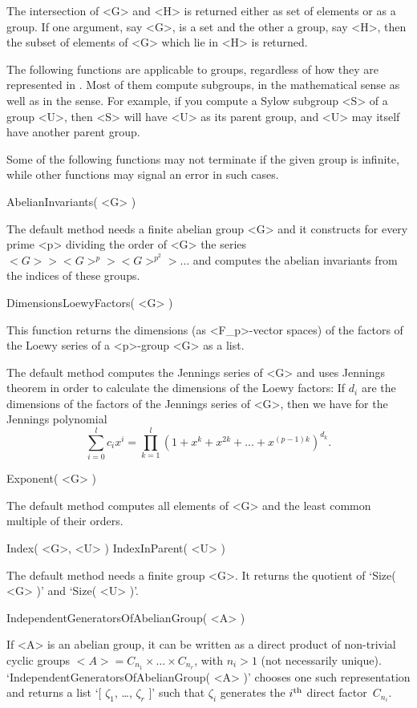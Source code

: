 The intersection of <G> and <H> is returned either  as set of elements or
as a group. If one argument, say <G>, is a set and the other a group, say
<H>, then the subset of elements of <G> which lie in <H> is returned.


The following functions are applicable to  groups, regardless of how they
are  represented in   {\GAP}.  Most of  them  compute  subgroups, in  the
mathematical sense as well  as in the  {\GAP} sense. For example,  if you
compute a Sylow subgroup  <S> of a group <U>,  then <S> will have  <U> as
its parent group, and <U> may itself have another parent group.

Some of the  following functions may not  terminate if the given group is
infinite, while other functions may signal an error in such cases.

\>AbelianInvariants( <G> )

The default method needs a finite abelian group <G> and it constructs for
every  prime  <p> dividing the  order  of <G>  the series $<G>  > <G>^p >
<G>^{p^2} > \ldots$ and computes the abelian  invariants from the indices
of these groups.

\>DimensionsLoewyFactors( <G> )

This  function returns the dimensions   (as  <F_p>-vector spaces) of  the
factors of the Loewy series of a <p>-group <G> as a list.

The default method computes the Jennings series  of <G> and uses Jennings
theorem  in order to  calculate the dimensions  of  the Loewy factors: If
$d_i$  are the dimensions  of the factors of  the Jennings series of <G>,
then we have for the Jennings polynomial
$$ \sum_{i=0}^l c_i x^i =
   \prod_{k=1}^l (1+x^k+x^{2k}+...+x^{(p-1)k})^{d_k}. $$

\>Exponent( <G> )

The  default method computes  all elements  of  <G> and  the least common
multiple of their orders.

\>Index( <G>, <U> )
\>IndexInParent( <U> )

The default method needs  a finite group <G>.  It returns the quotient of
`Size( <G> )' and `Size( <U> )'.

\>IndependentGeneratorsOfAbelianGroup( <A> )

If <A>  is an abelian group,  it  can be written  as  a direct product of
non-trivial cyclic groups $<A>  = C_{n_1} \times \ldots  \times C_{n_r}$,
with      $n_i>1$         (not               necessarily         unique).
`IndependentGeneratorsOfAbelianGroup(    <A>  )'  chooses       one  such
representation and returns a list `[  $\zeta_1$, \dots, $\zeta_r$ ]' such
that $\zeta_i$ generates the $i^{\rm th}$ direct factor~$C_{n_i}$.

